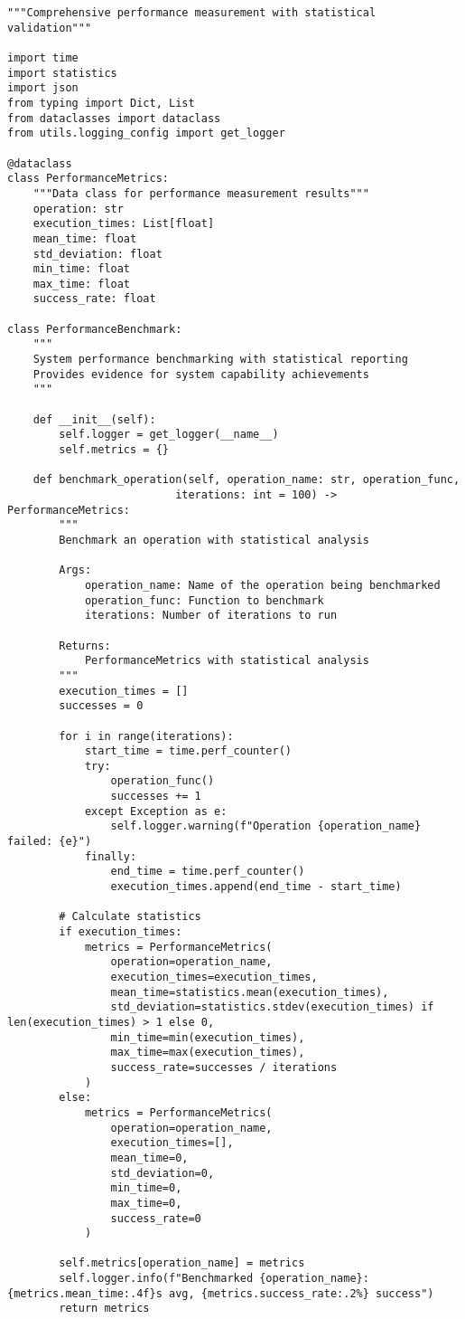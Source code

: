 \documentclass[11pt,a4paper]{article}
\begin{document}
\begin{verbatim}
"""Comprehensive performance measurement with statistical validation"""

import time
import statistics
import json
from typing import Dict, List
from dataclasses import dataclass
from utils.logging_config import get_logger

@dataclass
class PerformanceMetrics:
    """Data class for performance measurement results"""
    operation: str
    execution_times: List[float]
    mean_time: float
    std_deviation: float
    min_time: float
    max_time: float
    success_rate: float

class PerformanceBenchmark:
    """
    System performance benchmarking with statistical reporting
    Provides evidence for system capability achievements
    """

    def __init__(self):
        self.logger = get_logger(__name__)
        self.metrics = {}

    def benchmark_operation(self, operation_name: str, operation_func,
                          iterations: int = 100) -> PerformanceMetrics:
        """
        Benchmark an operation with statistical analysis

        Args:
            operation_name: Name of the operation being benchmarked
            operation_func: Function to benchmark
            iterations: Number of iterations to run

        Returns:
            PerformanceMetrics with statistical analysis
        """
        execution_times = []
        successes = 0

        for i in range(iterations):
            start_time = time.perf_counter()
            try:
                operation_func()
                successes += 1
            except Exception as e:
                self.logger.warning(f"Operation {operation_name} failed: {e}")
            finally:
                end_time = time.perf_counter()
                execution_times.append(end_time - start_time)

        # Calculate statistics
        if execution_times:
            metrics = PerformanceMetrics(
                operation=operation_name,
                execution_times=execution_times,
                mean_time=statistics.mean(execution_times),
                std_deviation=statistics.stdev(execution_times) if len(execution_times) > 1 else 0,
                min_time=min(execution_times),
                max_time=max(execution_times),
                success_rate=successes / iterations
            )
        else:
            metrics = PerformanceMetrics(
                operation=operation_name,
                execution_times=[],
                mean_time=0,
                std_deviation=0,
                min_time=0,
                max_time=0,
                success_rate=0
            )

        self.metrics[operation_name] = metrics
        self.logger.info(f"Benchmarked {operation_name}: {metrics.mean_time:.4f}s avg, {metrics.success_rate:.2%} success")
        return metrics
\end{verbatim}
\end{document}
